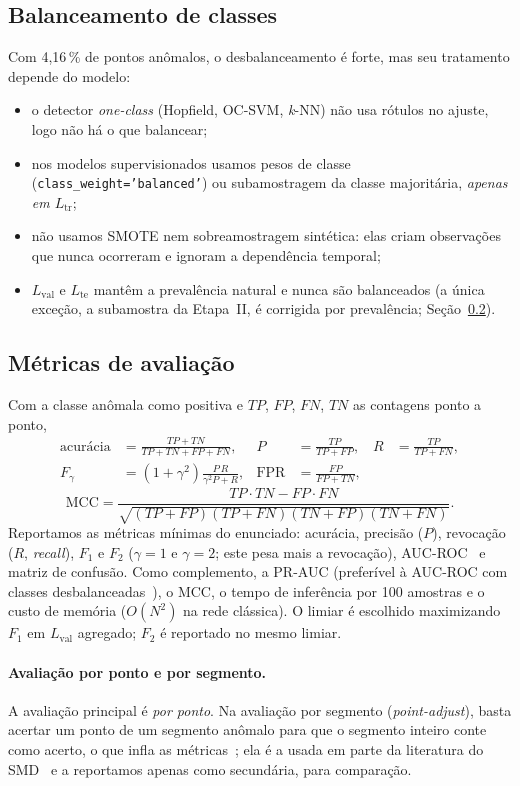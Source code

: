\subsection{Balanceamento de classes}\label{sec:balanceamento}
Com 4,16\,\% de pontos anômalos, o desbalanceamento é forte, mas seu tratamento depende do modelo:
\begin{itemize}
  \item o detector \emph{one-class} (Hopfield, OC-SVM, \emph{k}-NN) não usa rótulos no ajuste, logo não há o que
        balancear;
  \item nos modelos supervisionados usamos pesos de classe (\texttt{class\_weight='balanced'}) ou
        subamostragem da classe majoritária, \emph{apenas em $L_{\mathrm{tr}}$};
  \item não usamos SMOTE nem sobreamostragem sintética: elas criam observações que nunca ocorreram e ignoram a
        dependência temporal;
  \item $L_{\mathrm{val}}$ e $L_{\mathrm{te}}$ mantêm a prevalência natural e nunca são balanceados (a única
        exceção, a subamostra da Etapa~II, é corrigida por prevalência; Seção~\ref{sec:metricas}).
\end{itemize}

\subsection{Métricas de avaliação}\label{sec:metricas}
Com a classe anômala como positiva e $TP$, $FP$, $FN$, $TN$ as contagens ponto a ponto,
\begin{align*}
\text{acurácia}&=\frac{TP+TN}{TP+TN+FP+FN}, & P&=\frac{TP}{TP+FP}, & R&=\frac{TP}{TP+FN},\\
F_\gamma&=(1+\gamma^2)\frac{P\,R}{\gamma^2P+R}, & \mathrm{FPR}&=\frac{FP}{FP+TN},
\end{align*}
\[
\mathrm{MCC}=\frac{TP\cdot TN-FP\cdot FN}{\sqrt{(TP+FP)(TP+FN)(TN+FP)(TN+FN)}} .
\]
Reportamos as métricas mínimas do enunciado: acurácia, precisão ($P$), revocação ($R$, \emph{recall}), $F_1$ e
$F_2$ ($\gamma=1$ e $\gamma=2$; este pesa mais a revocação), AUC-ROC~\cite{fawcett2006} e matriz de confusão.
Como complemento, a PR-AUC (preferível à AUC-ROC com classes desbalanceadas~\cite{saito2015}), o MCC, o tempo
de inferência por 100 amostras e o custo de memória ($O(N^2)$ na rede clássica). O limiar é escolhido
maximizando $F_1$ em $L_{\mathrm{val}}$ agregado; $F_2$ é reportado no mesmo limiar.

\paragraph{Avaliação por ponto e por segmento.} A avaliação principal é \emph{por ponto}. Na avaliação por
segmento (\emph{point-adjust}), basta acertar um ponto de um segmento anômalo para que o segmento inteiro conte como
acerto, o que infla as métricas~\cite{kim2022}; ela é a usada em parte da literatura do SMD~\cite{su2019} e a
reportamos apenas como secundária, para comparação.

